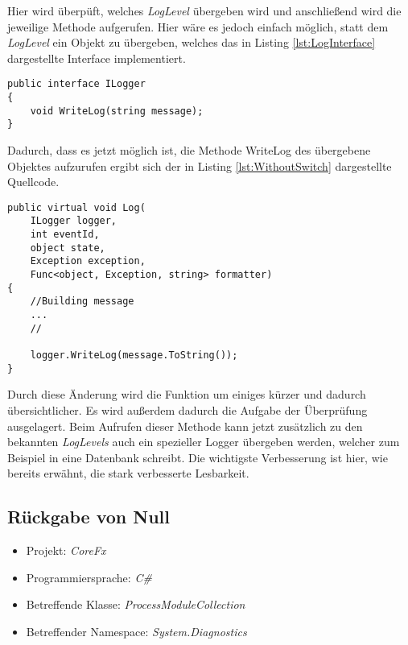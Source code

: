 \SuperPar Hier wird überpüft, welches \textit{LogLevel} übergeben wird und anschließend wird die jeweilige Methode aufgerufen. Hier wäre es jedoch einfach möglich, statt dem \textit{LogLevel}  ein Objekt zu übergeben, welches das in Listing \ref{lst:LogInterface} dargestellte Interface implementiert.

\begin{lstlisting}[language={[Sharp]C}, caption=Beispiele für ein Log Interface, label=lst:LogInterface]
public interface ILogger
{
	void WriteLog(string message);
}
\end{lstlisting}

\SuperPar Dadurch, dass es jetzt möglich ist, die Methode WriteLog des übergebene Objektes aufzurufen ergibt sich der in Listing \ref{lst:WithoutSwitch} dargestellte Quellcode.

\begin{lstlisting}[language={[Sharp]C}, caption=Beispiele für Switch Statement; label=lst:SwitchStatement]
public virtual void Log(
	ILogger logger,
	int eventId,
	object state,
	Exception exception,
	Func<object, Exception, string> formatter)
{
	//Building message
	...
	//

	logger.WriteLog(message.ToString());
}
\end{lstlisting}

\SuperPar Durch diese Änderung wird die Funktion um einiges kürzer und dadurch übersichtlicher. Es wird außerdem dadurch die Aufgabe der Überprüfung ausgelagert. Beim Aufrufen dieser Methode kann jetzt zusätzlich zu den bekannten \textit{LogLevels} auch ein spezieller Logger übergeben werden, welcher zum Beispiel in eine Datenbank schreibt. Die wichtigste Verbesserung ist hier, wie bereits erwähnt, die stark verbesserte Lesbarkeit. 


\subsection{Rückgabe von Null}
\begin{itemize}
	\item Projekt: \textit{CoreFx}
	\item Programmiersprache: \textit{C\#}
	\item Betreffende Klasse: \textit{ProcessModuleCollection}
	\item Betreffender Namespace: \textit{System.Diagnostics}
\end{itemize}

